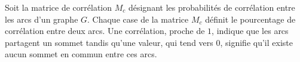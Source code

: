 %
%
% 
%
%
%
% 
%

Soit la  matrice de corr\'elation $M_{c}$ d\'esignant les probabilit\'es de corr\'elation entre les arcs d'un graphe $G$. 
Chaque case de la matrice $M_c$ d\'efinit le pourcentage de corr\'elation entre deux arcs. Une corr\'elation, proche de $1$, indique que les arcs partagent un sommet tandis qu'une valeur, qui tend vers $0$, signifie qu'il existe aucun sommet en commun entre ces arcs.

